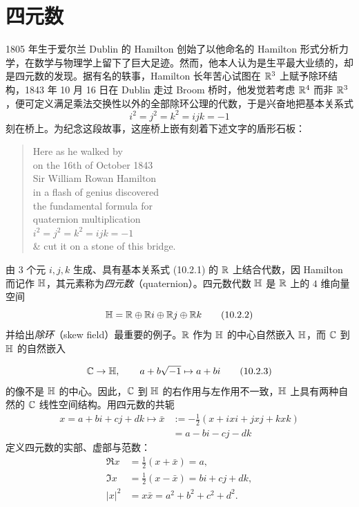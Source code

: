 
\section{四元数}

1805 年生于爱尔兰 Dublin 的 Hamilton 创始了以他命名的 Hamilton 形式分析力学，在数学与物理学上留下了巨大足迹。然而，他本人认为是生平最大业绩的，却是四元数的发现。据有名的轶事，Hamilton 长年苦心试图在 $\mathbb{R}^3$ 上赋予除环结构，1843 年 10 月 16 日在 Dublin 走过 Broom 桥时，他发觉若考虑 $\mathbb{R}^4$ 而非 $\mathbb{R}^3$，便可定义满足乘法交换性以外的全部除环公理的代数，于是兴奋地把基本关系式
\begin{equation}
  i^2=j^2=k^2=ijk=-1 \tag{10.2.1}
\end{equation}
刻在桥上。为纪念这段故事，这座桥上嵌有刻着下述文字的盾形石板：
\begin{quote}
  Here as he walked by\\
  on the 16th of October 1843\\
  Sir William Rowan Hamilton\\
  in a flash of genius discovered\\
  the fundamental formula for\\
  quaternion multiplication\\[4pt]
  $i^2=j^2=k^2=ijk=-1$\\[4pt]
  \& cut it on a stone of this bridge.
\end{quote}

由 $3$ 个元 $i,j,k$ 生成、具有基本关系式 (10.2.1) 的 $\mathbb{R}$ 上结合代数，因 Hamilton 而记作 $\mathbb{H}$，其元素称为\emph{四元数}（quaternion）。四元数代数 $\mathbb{H}$ 是 $\mathbb{R}$ 上的 $4$ 维向量空间
\begin{equation}
  \mathbb{H}=\mathbb{R}\oplus\mathbb{R} i\oplus\mathbb{R} j\oplus\mathbb{R} k \tag{10.2.2}
\end{equation}
并给出\emph{除环}（skew field）最重要的例子。$\mathbb{R}$ 作为 $\mathbb{H}$ 的中心自然嵌入 $\mathbb{H}$，而 $\mathbb{C}$ 到 $\mathbb{H}$ 的自然嵌入

\begin{equation}
  \mathbb{C}\to\mathbb{H},\qquad a+b\sqrt{-1}\mapsto a+bi \tag{10.2.3}
\end{equation}
的像不是 $\mathbb{H}$ 的中心。因此，$\mathbb{C}$ 到 $\mathbb{H}$ 的右作用与左作用不一致，$\mathbb{H}$ 上具有两种自然的 $\mathbb{C}$ 线性空间结构。用四元数的共轭
\begin{align}
  x=a+bi+cj+dk\mapsto\bar x&:=-\frac{1}{2}(x+ixi+jxj+kxk) \tag{10.2.4}\\
  &=a-bi-cj-dk \tag{10.2.5}
\end{align}
定义四元数的实部、虚部与范数：
\begin{align}
  \Re x&=\frac{1}{2}(x+\bar x)=a, \tag{10.2.6}\\
  \Im x&=\frac{1}{2}(x-\bar x)=bi+cj+dk, \tag{10.2.7}\\
  |x|^2&=x\bar x=a^2+b^2+c^2+d^2. \tag{10.2.8}
\end{align}


